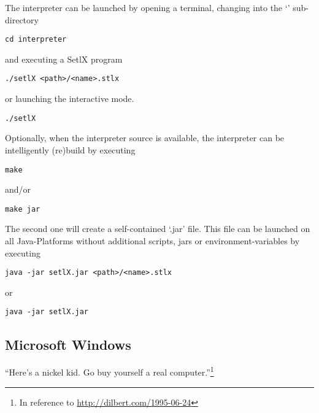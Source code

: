 The \setlX{} interpreter can be launched by opening a terminal, changing into the `' sub-directory

\begin{lstlisting}[frame=none,numbers=none]
cd interpreter
\end{lstlisting}

and executing a SetlX program

\begin{lstlisting}[frame=none,numbers=none]
./setlX <path>/<name>.stlx
\end{lstlisting}

or launching the interactive mode.

\begin{lstlisting}[frame=none,numbers=none]
./setlX
\end{lstlisting}

\vspace{1em}

Optionally, when the interpreter source is available, the interpreter can be intelligently (re)build by executing

\begin{lstlisting}[frame=none,numbers=none]
make
\end{lstlisting}

and/or

\begin{lstlisting}[frame=none,numbers=none]
make jar
\end{lstlisting}

The second one will create a self-contained `.jar' file. This file can be launched on all Java-Platforms without additional scripts, jars or environment-variables by executing

\begin{lstlisting}[frame=none,numbers=none]
java -jar setlX.jar <path>/<name>.stlx
\end{lstlisting}

or

\begin{lstlisting}[frame=none,numbers=none]
java -jar setlX.jar
\end{lstlisting}

\subsection{Microsoft Windows}

\begin{center}
\large
``Here's a nickel kid. Go buy yourself a real computer.''\footnote{In reference to \url{http://dilbert.com/1995-06-24}}
\end{center}

